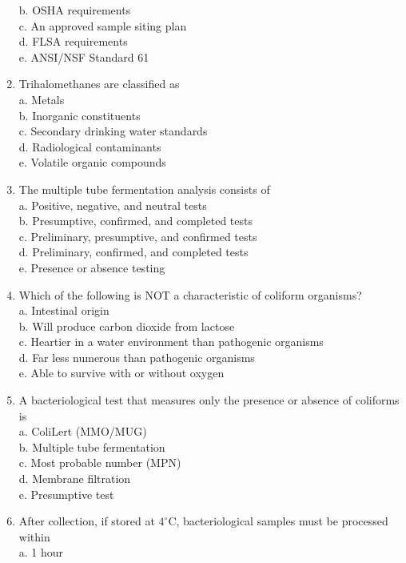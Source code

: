 \begin{enumerate}[1.]
b. OSHA requirements\\
c. An approved sample siting plan\\
d. FLSA requirements\\
e. ANSI/NSF Standard 61\\
  \item Trihalomethanes are classified as\\
a. Metals\\
b. Inorganic constituents\\
c. Secondary drinking water standards\\
d. Radiological contaminants\\
e. Volatile organic compounds\\
 \item The multiple tube fermentation analysis consists of\\
a. Positive, negative, and neutral tests\\
b. Presumptive, confirmed, and completed tests\\
c. Preliminary, presumptive, and confirmed tests\\
d. Preliminary, confirmed, and completed tests\\
e. Presence or absence testing\\
  \item Which of the following is NOT a characteristic of coliform organisms?\\
a. Intestinal origin\\
b. Will produce carbon dioxide from lactose\\
c. Heartier in a water environment than pathogenic organisms\\
d. Far less numerous than pathogenic organisms\\
e. Able to survive with or without oxygen\\
  \item A bacteriological test that measures only the presence or absence of coliforms is\\
a. ColiLert (MMO/MUG)\\
b. Multiple tube fermentation\\
c. Most probable number (MPN)\\
d. Membrane filtration\\
e. Presumptive test\\
  \item After collection, if stored at $4^{\circ} \mathrm{C}$, bacteriological samples must be processed within\\
a. 1 hour\\

\end{enumerate}
